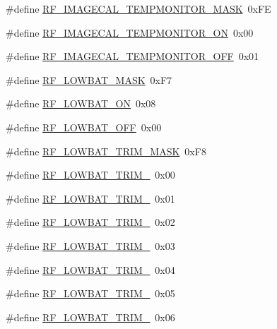 \begin{DoxyCompactItemize}
\#define \hyperlink{sx1276Regs-Fsk_8h_ab383d53c5725baec9e3eca281bb1c8ab}{R\+F\+\_\+\+I\+M\+A\+G\+E\+C\+A\+L\+\_\+\+T\+E\+M\+P\+M\+O\+N\+I\+T\+O\+R\+\_\+\+M\+A\+SK}~0x\+FE
\item 
\#define \hyperlink{sx1276Regs-Fsk_8h_af81f91a2ef01cc97f6c0da04fa990513}{R\+F\+\_\+\+I\+M\+A\+G\+E\+C\+A\+L\+\_\+\+T\+E\+M\+P\+M\+O\+N\+I\+T\+O\+R\+\_\+\+ON}~0x00
\item 
\#define \hyperlink{sx1276Regs-Fsk_8h_a88d0a3e79e03d24bc1d0585bb495a8f6}{R\+F\+\_\+\+I\+M\+A\+G\+E\+C\+A\+L\+\_\+\+T\+E\+M\+P\+M\+O\+N\+I\+T\+O\+R\+\_\+\+O\+FF}~0x01
\item 
\#define \hyperlink{sx1276Regs-Fsk_8h_abaff91d450af8669ffd50eb619e28483}{R\+F\+\_\+\+L\+O\+W\+B\+A\+T\+\_\+\+M\+A\+SK}~0x\+F7
\item 
\#define \hyperlink{sx1276Regs-Fsk_8h_ac8bf5b979c71e1fa7ff998f96136001c}{R\+F\+\_\+\+L\+O\+W\+B\+A\+T\+\_\+\+ON}~0x08
\item 
\#define \hyperlink{sx1276Regs-Fsk_8h_a5f220eb10ea52a4dfc62ca4675ddb55f}{R\+F\+\_\+\+L\+O\+W\+B\+A\+T\+\_\+\+O\+FF}~0x00
\item 
\#define \hyperlink{sx1276Regs-Fsk_8h_a668694c9fd9267c3dc4fa53354319ed9}{R\+F\+\_\+\+L\+O\+W\+B\+A\+T\+\_\+\+T\+R\+I\+M\+\_\+\+M\+A\+SK}~0x\+F8
\item 
\#define \hyperlink{sx1276Regs-Fsk_8h_a85288dbdf38735bd011bcdb471e993c7}{R\+F\+\_\+\+L\+O\+W\+B\+A\+T\+\_\+\+T\+R\+I\+M\+\_}~0x00
\item 
\#define \hyperlink{sx1276Regs-Fsk_8h_af835b4f1f8a866a42b09fa2e3f09c5cd}{R\+F\+\_\+\+L\+O\+W\+B\+A\+T\+\_\+\+T\+R\+I\+M\+\_}~0x01
\item 
\#define \hyperlink{sx1276Regs-Fsk_8h_ab0728e7072fa3d8924b464744703f078}{R\+F\+\_\+\+L\+O\+W\+B\+A\+T\+\_\+\+T\+R\+I\+M\+\_}~0x02
\item 
\#define \hyperlink{sx1276Regs-Fsk_8h_a7eecdc654023bc207f44edb51eadc593}{R\+F\+\_\+\+L\+O\+W\+B\+A\+T\+\_\+\+T\+R\+I\+M\+\_}~0x03
\item 
\#define \hyperlink{sx1276Regs-Fsk_8h_a460e532d54bd79a1403c4597e1fe00f9}{R\+F\+\_\+\+L\+O\+W\+B\+A\+T\+\_\+\+T\+R\+I\+M\+\_}~0x04
\item 
\#define \hyperlink{sx1276Regs-Fsk_8h_a1b4874343fe46f3e926ed05c244a418c}{R\+F\+\_\+\+L\+O\+W\+B\+A\+T\+\_\+\+T\+R\+I\+M\+\_}~0x05
\item 
\#define \hyperlink{sx1276Regs-Fsk_8h_ae5f2e0d03a4c5fa134faafcebc5fa522}{R\+F\+\_\+\+L\+O\+W\+B\+A\+T\+\_\+\+T\+R\+I\+M\+\_}~0x06
\item 

\end{DoxyCompactItemize}

